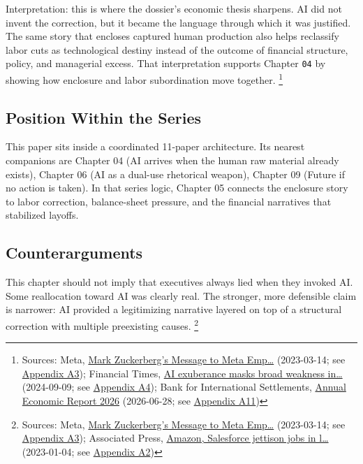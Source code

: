 \documentclass[
  american,
  11pt,
  letterpaper,
]{article}
\begin{document}
Interpretation: this is where the dossier's economic thesis sharpens. AI
did not invent the correction, but it became the language through which
it was justified. The same story that encloses captured human production
also helps reclassify labor cuts as technological destiny instead of the
outcome of financial structure, policy, and managerial excess. That
interpretation supports Chapter \texttt{04} by showing how enclosure and
labor subordination move together. \footnote{Sources: Meta,
  \href{https://about.fb.com/news/2023/03/mark-zuckerberg-meta-year-of-efficiency/}{Mark
  Zuckerberg's Message to Meta Emp\ldots{}} (2023-03-14; see
  \hyperref[ch-05-appendix-a3-mark-zuckerberg-s-message-to-meta-employees]{Appendix
  A3}); Financial Times,
  \href{https://www.ft.com/content/0b14d871-2d19-46f1-9660-5466301e8066}{AI
  exuberance masks broad weakness in\ldots{}} (2024-09-09; see
  \hyperref[ch-05-appendix-a4-ai-exuberance-masks-broad-weakness-in-tech-sector-say-investors]{Appendix
  A4}); Bank for International Settlements,
  \href{https://www.bis.org/publ/arpdf/ar2026e.pdf}{Annual Economic
  Report 2026} (2026-06-28; see
  \hyperref[ch-05-appendix-a11-annual-economic-report-2026]{Appendix
  A11})}

\subsection{Position Within the
Series}\label{position-within-the-series-5}

This paper sits inside a coordinated 11-paper architecture. Its nearest
companions are Chapter 04 (AI arrives when the human raw material
already exists), Chapter 06 (AI as a dual-use rhetorical weapon),
Chapter 09 (Future if no action is taken). In that series logic, Chapter
05 connects the enclosure story to labor correction, balance-sheet
pressure, and the financial narratives that stabilized layoffs.

\subsection{Counterarguments}\label{counterarguments-5}

This chapter should not imply that executives always lied when they
invoked AI. Some reallocation toward AI was clearly real. The stronger,
more defensible claim is narrower: AI provided a legitimizing narrative
layered on top of a structural correction with multiple preexisting
causes. \footnote{Sources: Meta,
  \href{https://about.fb.com/news/2023/03/mark-zuckerberg-meta-year-of-efficiency/}{Mark
  Zuckerberg's Message to Meta Emp\ldots{}} (2023-03-14; see
  \hyperref[ch-05-appendix-a3-mark-zuckerberg-s-message-to-meta-employees]{Appendix
  A3}); Associated Press,
  \href{https://apnews.com/article/bbb2f3a09eafdfc7cda54a3b87e538ad}{Amazon,
  Salesforce jettison jobs in l\ldots{}} (2023-01-04; see
  \hyperref[ch-05-appendix-a2-amazon-salesforce-jettison-jobs-in-latest-tech-worker-purge]{Appendix
  A2})}
\end{document}
